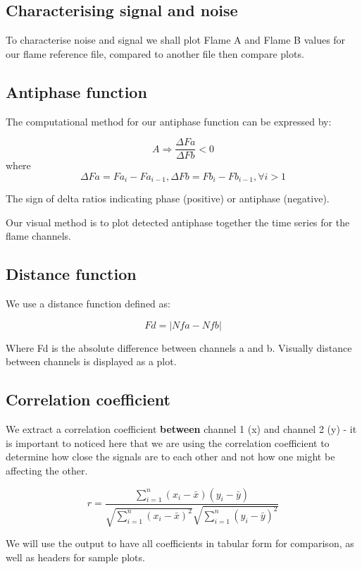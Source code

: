 \subsection{Characterising signal and noise}

To characterise noise and signal we shall plot Flame A and Flame B values for our flame reference file, compared to another file then compare plots.

\subsection{Antiphase function}

The computational method for our antiphase function can be expressed by:

$$  A \Rightarrow \frac{\Delta Fa}{\Delta Fb}<0$$
where
$$ \Delta Fa = Fa{_i}-Fa{_{i-1}}, \Delta Fb = Fb{_i}-Fb{_{i-1}}, \forall i > 1 $$

The sign of delta ratios indicating phase (positive) or antiphase (negative).

Our visual method is to plot detected antiphase together the time series for the flame channels.

\subsection{Distance function}

We use a distance function defined as:

$$ Fd = |Nfa - Nfb| $$

Where Fd is the absolute difference between channels a and b. Visually distance between channels is displayed as a plot. 

\subsection{Correlation coefficient}

We extract a correlation coefficient \textbf{between} channel 1 (x) and channel 2 (y) - it is important to noticed here that we are using the correlation coefficient to determine how close the signals are to each other and not how one might be affecting the other.

$$ r =\frac{\sum ^n _{i=1}(x_i - \bar{x})(y_i - \bar{y})}{\sqrt{\sum ^n _{i=1}(x_i - \bar{x})^2} \sqrt{\sum ^n _{i=1}(y_i - \bar{y})^2}} $$

We will use the output to have all coefficients in tabular form for comparison, as well as headers for sample plots.

